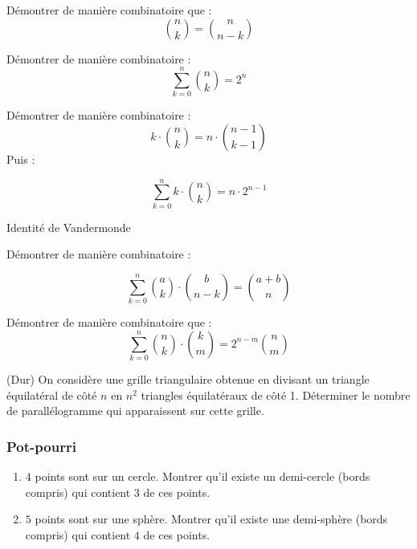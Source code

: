 \begin{exo}

\vspace{1 mm}

Démontrer de manière combinatoire que :
$$\binom{n}{k}=\binom{n}{n-k}$$
\end{exo}

\begin{exo}

Démontrer de manière combinatoire :
$$ \sum_{k = 0}^{n}{\binom{n}{k}} = 2^{n} $$
\end{exo}

\begin{exo}

\vspace{1 mm}

Démontrer de manière combinatoire :
$$k \cdot \binom{n}{k} = n \cdot \binom{n-1}{k-1}$$
Puis :

$$\sum_{k = 0}^{n}{k \cdot \binom{n}{k}} = n \cdot 2^{n-1}$$

\end{exo}

\begin{exo}{Identité de Vandermonde}

\vspace{1 mm}

Démontrer de manière combinatoire :

$$\sum_{k = 0}^{n}{\binom{a}{k} \cdot \binom{b}{n-k}} = \binom{a+b}{n}$$
\end{exo}

\begin{exo}

\vspace{1 mm}

Démontrer de manière combinatoire que :
$$\sum_{k = 0}^{n}{\binom{n}{k} \cdot \binom{k}{m}} = 2^{n-m}{\binom{n}{m}}$$
\end{exo}


\begin{exo}
(Dur) On considère une grille triangulaire obtenue en divisant un triangle équilatéral de côté $n$ en $n^2$ triangles équilatéraux de côté 1. Déterminer le nombre de parallélogramme qui apparaissent sur cette grille.
\end{exo}


\subsubsection{Pot-pourri}

\begin{exo}
\begin{enumerate}
    \item $4$ points sont sur un cercle. Montrer qu’il existe un demi-cercle (bords compris) qui contient $3$ de ces points.
\item $5$ points sont sur une sphère. Montrer qu’il existe une demi-sphère (bords compris) qui contient $4$ de ces points.
\end{enumerate}

\end{exo}

